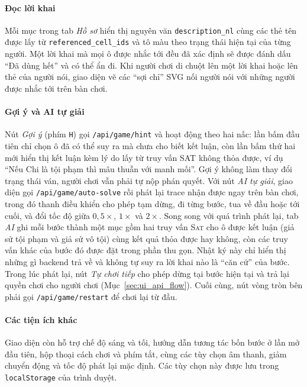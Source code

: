 \begin{sloppypar}
\paragraph{Đọc lời khai}
Mỗi mục trong tab \emph{Hồ sơ} hiển thị nguyên văn \texttt{description\_nl}
cùng các thẻ tên được lấy từ \texttt{referenced\_cell\_ids} và tô màu theo trạng
thái hiện tại của từng người. Một lời khai mà mọi ô được nhắc tới đều đã xác
định sẽ được đánh dấu ``Đã dùng hết'' và có thể ẩn đi. Khi người chơi di chuột
lên một lời khai hoặc lên thẻ của người nói, giao diện vẽ các ``sợi chỉ'' SVG nối
người nói với những người được nhắc tới trên bàn chơi.

\paragraph{Gợi ý và AI tự giải}
Nút \emph{Gợi ý} (phím \texttt{H}) gọi \nolinkurl{/api/game/hint} và hoạt động
theo hai nấc: lần bấm đầu tiên chỉ chọn ô đã có thể suy ra mà chưa cho biết kết
luận, còn lần bấm thứ hai mới hiển thị kết luận kèm lý do lấy từ truy vấn SAT
không thỏa được, ví dụ ``Nếu Chi là tội phạm thì mâu thuẫn với manh mối''. Gợi ý
không làm thay đổi trạng thái ván, người chơi vẫn phải tự nộp phán quyết. Với
nút \emph{AI tự giải}, giao diện gọi \nolinkurl{/api/game/auto-solve} rồi phát
lại trace nhận được ngay trên bàn chơi, trong đó thanh điều khiển cho phép tạm
dừng, đi từng bước, tua về đầu hoặc tới cuối, và đổi tốc độ giữa $0{,}5\times$,
$1\times$ và $2\times$. Song song với quá trình phát lại, tab \emph{AI} ghi mỗi
bước thành một mục gồm hai truy vấn \textsc{Sat} cho ô được kết luận (giả sử tội
phạm và giả sử vô tội) cùng kết quả thỏa được hay không, còn các truy vấn khác
của bước đó được đặt trong phần thu gọn. Nhật ký này chỉ hiển thị những gì
backend trả về và không tự suy ra lời khai nào là ``căn cứ'' của bước. Trong lúc
phát lại, nút \emph{Tự chơi tiếp} cho phép dừng tại bước hiện tại và trả lại
quyền chơi cho người chơi (Mục~\ref{sec:ui_api_flow}). Cuối cùng, nút vòng tròn
bên phải gọi \nolinkurl{/api/game/restart} để chơi lại từ đầu.

\paragraph{Các tiện ích khác}
Giao diện còn hỗ trợ chế độ sáng và tối, hướng dẫn tương tác bốn bước ở lần mở
đầu tiên, hộp thoại cách chơi và phím tắt, cùng các tùy chọn âm thanh, giảm
chuyển động và tốc độ phát lại mặc định. Các tùy chọn này được lưu trong
\texttt{localStorage} của trình duyệt.
\end{sloppypar}
